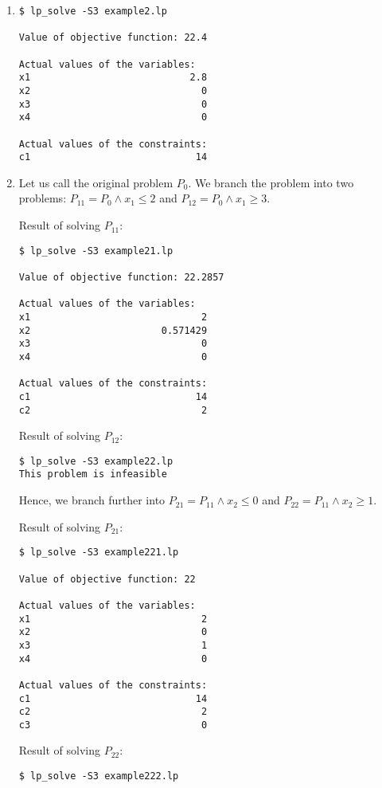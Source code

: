 \documentclass[a4paper, oneside]{scrartcl}
\begin{document}
\begin{enumerate}
  \item 
\begin{verbatim}
$ lp_solve -S3 example2.lp 

Value of objective function: 22.4

Actual values of the variables:
x1                            2.8
x2                              0
x3                              0
x4                              0

Actual values of the constraints:
c1                             14
\end{verbatim}
  \item 
Let us call the original problem $P_0$.
We branch the problem into two problems: $P_{11} = P_0 \wedge x_1 \leq 2$ and
$P_{12} = P_0 \wedge x_1 \geq 3$. 

Result of solving $P_{11}$:
\begin{verbatim}
$ lp_solve -S3 example21.lp 

Value of objective function: 22.2857

Actual values of the variables:
x1                              2
x2                       0.571429
x3                              0
x4                              0

Actual values of the constraints:
c1                             14
c2                              2
\end{verbatim}

Result of solving $P_{12}$:
\begin{verbatim}
$ lp_solve -S3 example22.lp 
This problem is infeasible
\end{verbatim}

Hence, we branch further into $P_{21} = P_{11} \wedge x_2 \leq 0$ and $P_{22} =
P_{11} \wedge x_2 \geq 1$.

Result of solving $P_{21}$:
\begin{verbatim}
$ lp_solve -S3 example221.lp 

Value of objective function: 22

Actual values of the variables:
x1                              2
x2                              0
x3                              1
x4                              0

Actual values of the constraints:
c1                             14
c2                              2
c3                              0
\end{verbatim}

Result of solving $P_{22}$:
\begin{verbatim}
$ lp_solve -S3 example222.lp 


\end{verbatim}
\end{enumerate}
\end{document}
